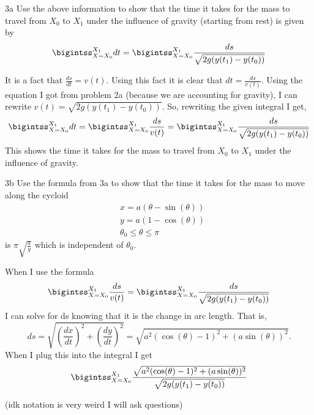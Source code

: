 \documentclass[titlepage]{article}
\begin{document}
\begin{problem}{3a}
Use the above information to show that the time it takes for the mass to travel from $X_0$ to $X_1$ under the influence of gravity (starting from rest) is given by
$$\bigintss_{X=X_0}^{X_1}dt = \bigintss_{X=X_0}^{X_1}\frac{ds}{\sqrt{2g(y(t_1)-y(t_0))}}$$
\end{problem}
\begin{solution}
It is a fact that $\frac{ds}{dt} = v(t)$. Using this fact it is clear that $dt =\frac{ds}{v(t)}$. Using the equation I got from problem 2a (because we are accounting for gravity), I can rewrite $v(t) = \sqrt{2g(y(t_1)-y(t_0))}$. So, rewriting the given integral I get,
$$\bigintss_{X=X_0}^{X_1}dt = \bigintss_{X=X_0}^{X_1} \frac{ds}{v(t)} = \bigintss_{X=X_0}^{X_1} \frac{ds}{\sqrt{2g(y(t_1)-y(t_0))}}$$
This shows the time it takes for the mass to travel from $X_0$ to $X_1$ under the influence of gravity.
\end{solution}

\begin{problem}{3b}
Use the formula from 3a to show that the time it takes for the mass to move along the cycloid
\begin{align*}
&x=a(\theta - \sin(\theta)) \\
&y=a(1-\cos(\theta)) \\ 
&\theta_0\leq \theta \leq \pi
\end{align*}
is $\pi\sqrt{\frac{a}{g}}$ which is independent of $\theta_0.$
\end{problem}

\begin{solution}
When I use the formula
$$ \bigintss_{X=X_0}^{X_1} \frac{ds}{v(t)} = \bigintss_{X=X_0}^{X_1} \frac{ds}{\sqrt{2g(y(t_1)-y(t_0))}} $$
I can solve for ds knowing that it is the change in arc length. That is,
$$ds = \sqrt{\left(\frac{dx}{dt}\right)^2 + \left(\frac{dy}{dt}\right)^2} = \sqrt{a^2(\cos(\theta)-1)^2 + (a\sin(\theta))^2}.$$
When I plug this into the integral I get 
$$ \bigintss_{X=X_0}^{X_1} \frac{\sqrt{a^2(\cos(\theta)-1)^2 + (a\sin(\theta))^2}}{\sqrt{2g(y(t_1)-y(t_0))}}  $$

(idk notation is very weird I will ask questions)
\end{solution}
\end{document}
